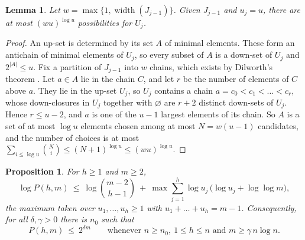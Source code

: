 \documentclass[11pt,reqno]{amsart}
\numberwithin{equation}{section}
\theoremstyle{plain}
\newtheorem{lemma}[theorem]{Lemma}
\newtheorem{proposition}[theorem]{Proposition}
\theoremstyle{definition}
\theoremstyle{remark}
\DeclareMathOperator{\width}{width}
\begin{document}
\begin{lemma}
\label{lem:choices}
Let $w=\max\{1,\width(J_{j-1})\}$. Given $J_{j-1}$ and $u_j=u$, there are
at most $(wu)^{\log u}$ possibilities for $U_j$.
\end{lemma}

\begin{proof}
An up-set is determined by its set $A$ of minimal elements. These form an
antichain of minimal elements of $U_j$, so every subset of $A$ is a
down-set of $U_j$ and $2^{|A|}\le u$. Fix a partition of $J_{j-1}$ into
$w$ chains, which exists by Dilworth's theorem \cite{Di50}. Let $a\in A$
lie in the chain $C$, and let $r$ be the number of elements of $C$ above
$a$. They lie in the up-set $U_j$, so $U_j$ contains a chain $a=c_0<c_1<
\dots<c_r$, whose down-closures in $U_j$ together with $\varnothing$ are
$r+2$ distinct down-sets of $U_j$. Hence $r\le u-2$, and $a$ is one of the
$u-1$ largest elements of its chain. So $A$ is a set of at most $\log u$
elements chosen among at most $N=w(u-1)$ candidates, and the number of
choices is at most $\sum_{i\le\log u}\binom Ni\le(N+1)^{\log u}\le
(wu)^{\log u}$.
\end{proof}

\begin{proposition}
\label{prop:posets}
For $h\ge1$ and $m\ge2$,
\[
\log P(h,m)\ \le\ \log\binom{m-2}{h-1}\ +\ \max\sum_{j=1}^{h}\log u_j\,
\bigl(\log u_j+\log\log m\bigr),
\]
the maximum taken over $u_1,\dots,u_h\ge1$ with $u_1+\dots+u_h=m-1$.
Consequently, for all $\delta,\gamma>0$ there is $n_0$ such that
\[
P(h,m)\ \le\ 2^{\delta m}\qquad\text{whenever } n\ge n_0,\ 1\le h\le n
\text{ and } m\ge\gamma\,n\log n .
\]
\end{proposition}
\end{document}
